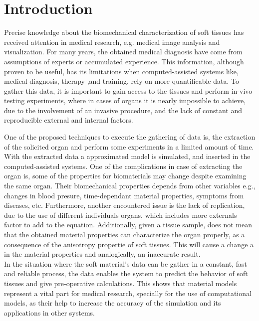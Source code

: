 
\chapter{Introduction} %

\label{Chapter2} %

Precise knowledge about the biomechanical characterization of soft tissues has received 
attention in medical research, e.g. medical image analysis and visualization.
For many years, the obtained medical diagnosis have come from assumptions of experts or 
accumulated experience. This information, although proven to be useful, has its limitations 
when computed-assisted systems like, medical diagnosis, therapy ,and training, rely on 
more quantificable data\cite{Kauer2002}. To gather this data, it is important to gain access
to the tissues and perform in-vivo testing experiments, where in cases of organs it is nearly 
impossible to achieve, due to the involvement of an invasive procedure, and the lack of constant
and reproducible external and internal factors. \\ \cite{Reference1}

One of the proposed techniques to execute the gathering of data is, the extraction of the 
solicited organ and perform some experiments in a limited amount of time. With the extracted 
data a approximated model is simulated, and inserted in the computed-assisted systems.
One of the complications in case of extracting the organ is, some of the properties for 
biomaterials may change despite examining the same organ. Their biomechanical properties depends
 from other variables e.g., changes in blood presure, time-dependant material properties, symptoms 
 from diseases, etc. Furthermore, another 
encountered issue is the lack of replication, due to the use of different individuals organs,
which includes more externals factor to add to the equation. Additionally, given a tissue sample,
 does not mean that the obtained material properties can characterize the organ properly, as a 
 consequence of the anisotropy propertie of soft tissues. This will cause a change a in the 
 material properties and analogically, an inaccurate result.
\\

In the situation where the soft material's data can be gather in a constant, fast and reliable
process, the data enables the system to predict the behavior of soft tissues and give pre-operative
 calculations. This shows that material models represent a vital part for medical research, 
 specially for the use of computational models, as their help to increase the accuracy of the 
 simulation and its applications in other systems. 

